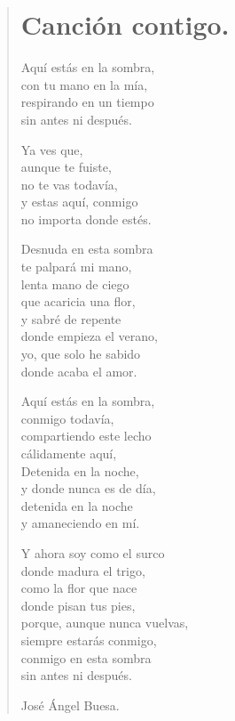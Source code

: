 \documentclass[11pt, portrait, twoside, notitlepage, openright]{book}
\begin{document}
\newpage
\begin{verse}
\begin{center}
\section{Canción contigo.}
\end{center}
Aquí estás en la sombra,\\
con tu mano en la mía,\\
respirando en un tiempo\\
sin antes ni después.
\newline

Ya ves que,\\
aunque te fuiste,\\
no te vas todavía,\\
y estas aquí, conmigo\\
no importa donde estés.
\newline

Desnuda en esta sombra\\
te palpará mi mano,\\
lenta mano de ciego\\
que acaricia una flor,\\
y sabré de repente\\
donde empieza el verano,\\
yo, que solo he sabido\\
donde acaba el amor.
\newline

Aquí estás en la sombra,\\
conmigo todavía,\\
compartiendo este lecho\\
cálidamente aquí,\\
Detenida en la noche,\\
y donde nunca es de día,\\
detenida en la noche\\
y amaneciendo en mí.
\newline

Y ahora soy como el surco\\
donde madura el trigo,\\
como la flor que nace\\
donde pisan tus pies,\\
porque, aunque nunca vuelvas,\\
siempre estarás conmigo,\\
conmigo en esta sombra\\
sin antes ni después.
\newline

José Ángel Buesa.
\end{verse}
\end{document}

